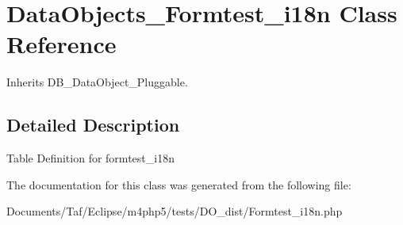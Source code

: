 \hypertarget{classDataObjects__Formtest__i18n}{
\section{DataObjects\_\-Formtest\_\-i18n Class Reference}
\label{classDataObjects__Formtest__i18n}
}
Inherits DB\_\-DataObject\_\-Pluggable.



\subsection{Detailed Description}
Table Definition for formtest\_\-i18n 

The documentation for this class was generated from the following file:\begin{CompactItemize}
\item 
Documents/Taf/Eclipse/m4php5/tests/DO\_\-dist/Formtest\_\-i18n.php\end{CompactItemize}
